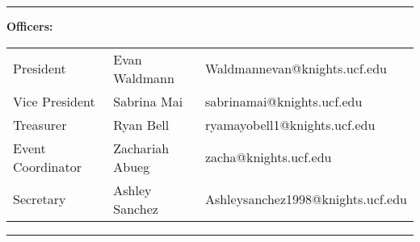 \documentclass{invoice} %
\begin{document}
\vspace*{-1cm}
\newline
\vspace{2mm}
\vspace{3.5mm}
\hrule %


\begin{flushleft}
{\bf Officers:} \newline
\begin{tabular}{p{4cm} p{4cm} p{4cm}}
    President & Evan Waldmann & Waldmannevan@knights.ucf.edu\\
    Vice President & Sabrina Mai & sabrinamai@knights.ucf.edu\\
   Treasurer & Ryan Bell & ryamayobell1@knights.ucf.edu\\
   Event Coordinator & Zachariah Abueg & zacha@knights.ucf.edu\\
   Secretary & Ashley Sanchez & Ashleysanchez1998@knights.ucf.edu\\
\end{tabular}

\hrule
\end{flushleft}
\vspace{2mm}


\begin{invoiceTable}



\subtotal










\end{invoiceTable}
\vfill
\end{document}
